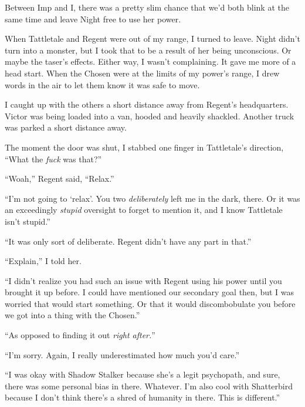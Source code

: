 Between Imp and I, there was a pretty slim chance that we'd both blink at the same time and leave Night free to use her power.



When Tattletale and Regent were out of my range, I turned to leave.  Night didn't turn into a monster, but I took that to be a result of her being unconscious.  Or maybe the taser's effects.  Either way, I wasn't complaining.  It gave me more of a head start.  When the Chosen were at the limits of my power's range, I drew words in the air to let them know it was safe to move.



I caught up with the others a short distance away from Regent's headquarters.  Victor was being loaded into a van, hooded and heavily shackled.  Another truck was parked a short distance away.



The moment the door was shut, I stabbed one finger in Tattletale's direction, ``What the \emph{fuck} was that?''



``Woah,'' Regent said, ``Relax.''



``I'm not going to `relax'.  You two \emph{deliberately} left me in the dark, there.  Or it was an exceedingly \emph{stupid} oversight to forget to mention it, and I know Tattletale isn't stupid.''



``It was only sort of deliberate.  Regent didn't have any part in that.''



``Explain,'' I told her.



``I didn't realize you had such an issue with Regent using his power until you brought it up before.  I could have mentioned our secondary goal then, but I was worried that would start something.  Or that it would discombobulate you before we got into a thing with the Chosen.''



``As opposed to finding it out \emph{right after.}''



``I'm sorry.  Again, I really underestimated how much you'd care.''



``I was okay with Shadow Stalker because she's a legit psychopath, and sure, there was some personal bias in there.  Whatever.  I'm also cool with Shatterbird because I don't think there's a shred of humanity in there.  This is different.''



